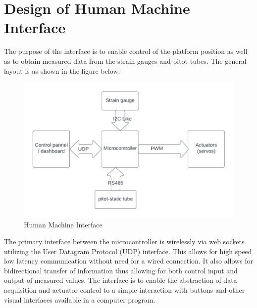 \section{Design of Human Machine Interface}
The purpose of the interface is to enable control of the platform position as well as to obtain measured data from the strain gauges and pitot tubes. 
The general layout is as shown in the figure below:
\begin{center}
\begin{figure}[H]
\centering
\includegraphics{Figures/Interface}
\caption[Human Machine Interface]{Human Machine Interface}
\end{figure}
\end{center}

The primary interface between the microcontroller is wirelessly via web sockets utilizing the User Datagram Protocol (UDP) interface. This allows for high speed low latency communication without need for a wired connection. It also allows for bidirectional transfer of information thus allowing for both control input and output of measured values. The interface is to enable the abstraction of data acquisition and actuator control to a simple interaction with buttons and other visual interfaces available in a computer program.

